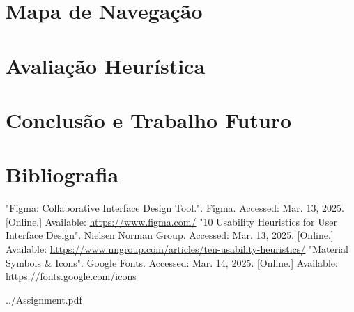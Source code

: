 \documentclass[12pt, a4paper]{article}
\begin{document}
\section{Mapa de Navegação}

\section{Avaliação Heurística}

\section{Conclusão e Trabalho Futuro}

\begingroup
\section{Bibliografia}
\renewcommand{\section}[2]{}

\begin{thebibliography}{9}
        "Figma: Collaborative Interface Design Tool."{}. Figma. Accessed: Mar. 13, 2025. [Online.]
        Available: \url{https://www.figma.com/}
        "10 Usability Heuristics for User Interface Design". Nielsen Norman Group.
        Accessed: Mar. 13, 2025. [Online.] Available:
        \url{https://www.nngroup.com/articles/ten-usability-heuristics/}
        "Material Symbols \& Icons"{}. Google Fonts. Accessed: Mar. 14, 2025. [Online.] Available:
        \url{https://fonts.google.com/icons}
\end{thebibliography}
\endgroup


    {../Assignment.pdf}

\end{document}
